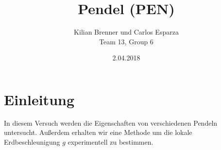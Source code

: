 \documentclass[12pt,a4paper]{article}
\title{Pendel (PEN)}
\author{Kilian Brenner und Carlos Esparza \\ Team 13, Group 6}
\date{2.04.2018}
\begin{document}
\maketitle
\tableofcontents
\newpage

\section{Einleitung}
In diesem Versuch werden die Eigenschaften von verschiedenen Pendeln untersucht. Außerdem erhalten wir eine Methode um die lokale Erdbeschleunigung $g$ experimentell zu bestimmen. 










%
\end{document}
